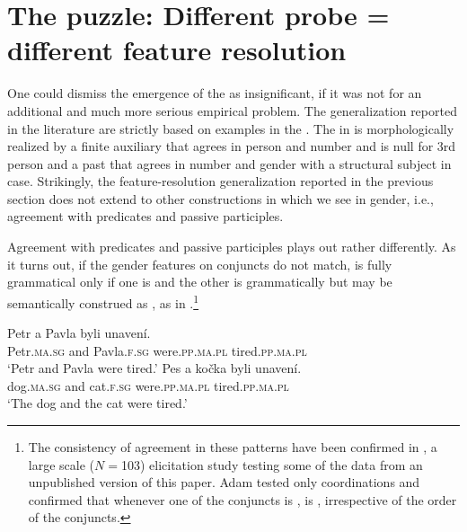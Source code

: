 \documentclass[output=paper,modfontsnewtxmath,hidelinks]{langscibook}
\begin{document}
\section{The puzzle: Different probe = different feature resolution}\label{sec:puzzle}

One could dismiss the emergence of the    as insignificant, if it was not for an additional and much more serious empirical problem. The generalization reported in the literature are strictly based on examples in the . The  in  is morphologically realized by a finite auxiliary that agrees in person and number and is null for 3rd person and a past  that agrees in number and gender with a structural subject in  case. Strikingly, the feature-resolution generalization reported in the previous section does not extend to other constructions in which we see  in gender, i.e., agreement with  predicates and passive participles. 

Agreement with  predicates and passive participles plays out rather differently. As it turns out, if the gender features on conjuncts do not match,  is fully grammatical only if one  is   and the other  is grammatically  but may be semantically construed as , as in .\footnote{The consistency of   agreement in these patterns have been confirmed in \citet{Adam:2017}, a large scale ($N={}$103) elicitation study testing some of the data from an unpublished version of this paper. Adam tested only  coordinations and confirmed that whenever one of the conjuncts is  ,  is  , irrespective of the order of the conjuncts.}


\ea\label{anim-2}
\ea\gll Petr a Pavla byli unavení.\\
Petr.\textsc{ma.sg} and Pavla.\textsc{f.sg} were.\textsc{pp.ma.pl} tired.\textsc{pp.ma.pl}\\
\glt `Petr and Pavla were tired.'\smallskip
\ex\gll  Pes a kočka byli unavení.\\
dog.\textsc{ma.sg} and cat.\textsc{f.sg} were.\textsc{pp.ma.pl} tired.\textsc{pp.ma.pl}\\
\glt `The dog and the cat were tired.'\\
\z
\hfill {}
\z
\end{document}
